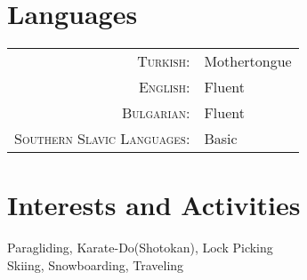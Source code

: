 \documentclass[a4paper,10pt]{article}
\begin{document}
\section{Languages}
\begin{tabular}{rl}
 \textsc{Turkish:}&Mothertongue\\
\textsc{English:}&Fluent\\
\textsc{Bulgarian:}&Fluent\\
\textsc{Southern Slavic Languages:}&Basic\\
\end{tabular}

\section{Interests and Activities}
Paragliding, Karate-Do(Shotokan), Lock Picking\\
Skiing, Snowboarding, Traveling
\end{document}
